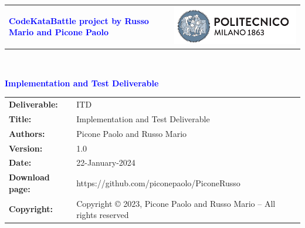 




\begin{titlepage}


{\begin{table}[t!]
\centering
\begin{tabu} to \textwidth { X[1.3,r,p] X[1.7,l,p] }
\textcolor{Blue}
{\textbf{\small{CodeKataBattle project by Russo Mario and Picone Paolo}}} & \includegraphics[scale=0.5]{Images/PolimiLogo}
\end{tabu}
\end{table}}~\\ [7cm]


\begin{flushleft}

{\textcolor{Blue}{\textbf{\Huge{Implementation and Test Deliverable}}}} \\ [1cm]

\end{flushleft}

\end{titlepage}

\begin{table}[h!]
\begin{tabu} to \textwidth { X[0.3,r,p] X[0.7,l,p] }
\hline

\textbf{Deliverable:} & ITD\\
\textbf{Title:} & Implementation and Test Deliverable \\
\textbf{Authors:} & Picone Paolo and Russo Mario\\
\textbf{Version:} & 1.0 \\ 
\textbf{Date:} & 22-January-2024 \\
\textbf{Download page:} & https://github.com/piconepaolo/PiconeRusso \\
\textbf{Copyright:} & Copyright © 2023, Picone Paolo and Russo Mario – All rights reserved \\
\hline
\end{tabu}
\end{table}




